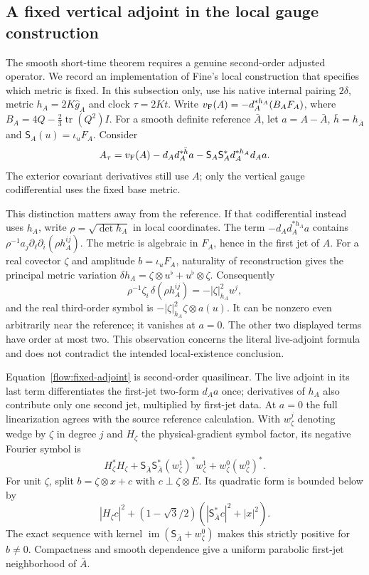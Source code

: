 \documentclass[11pt]{article}
\numberwithin{equation}{section}
\theoremstyle{definition}
\theoremstyle{remark}
\begin{document}
\subsection{A fixed vertical adjoint in the local gauge construction}
\label{subsec:fixed-adjoint}

The smooth short-time theorem requires a genuine second-order adjusted
operator.  We record an implementation of Fine's local construction
\cite[Section 4.2]{Fine2011} that specifies which metric is fixed.
In this subsection only, use his native internal pairing $2\delta$,
metric $h_A=2K\widehat g_A$ and clock $\tau=2Kt$.
Write $v_{\rm F}(A)=-d_A^{*h_A}(B_AF_A)$, where
$B_A=4Q-\tfrac23\operatorname{tr}(Q^2)I$.
For a smooth definite reference $\bar A$, let $a=A-\bar A$,
$\bar h=h_{\bar A}$ and $\mathsf S_A(u)=\iota_uF_A$.
Consider
\begin{equation}\label{flow:fixed-adjoint}
 A_\tau=v_{\rm F}(A)-d_A d_A^{*\bar h}a
              -\mathsf S_A\mathsf S_A^*d_A^{*h_A}d_Aa.
\end{equation}
The exterior covariant derivatives still use $A$; only the
vertical gauge codifferential uses the fixed base metric.

This distinction matters away from the reference.  If that
codifferential instead uses $h_A$, write
$\rho=\sqrt{\det h_A}$ in local coordinates.  The term
$-d_A d_A^{*h_A}a$ contains
$\rho^{-1}a_j\partial_\ell\partial_i(\rho h_A^{ij})$.
The metric is algebraic in $F_A$, hence in the first jet of $A$.
For a real covector $\zeta$ and amplitude $b=\iota_uF_A$,
naturality of reconstruction gives the principal metric variation
$\delta h_A=\zeta\otimes u^\flat+u^\flat\otimes\zeta$.  Consequently
\[
 \rho^{-1}\zeta_i\,\delta(\rho h_A^{ij})
       =-|\zeta|_{h_A}^2u^j,
\]
and the real third-order symbol is
$-|\zeta|_{h_A}^2\zeta\otimes a(u)$.
It can be nonzero even arbitrarily near the reference; it vanishes
at $a=0$.  The other two displayed terms have order at most two.
This observation concerns the literal live-adjoint formula and
does not contradict the intended local-existence conclusion.

Equation~\eqref{flow:fixed-adjoint} is second-order quasilinear.
The live adjoint in its last term differentiates the first-jet
two-form $d_Aa$ once; derivatives of $h_A$ also contribute only
one second jet, multiplied by first-jet data.  At $a=0$ the
full linearization agrees with the source reference calculation.
With $w_\zeta^j$ denoting wedge by $\zeta$ in degree $j$ and
$H_\zeta$ the physical-gradient symbol factor, its negative
Fourier symbol is
\[
 H_\zeta^*H_\zeta+
 \mathsf S_{\bar A}\mathsf S_{\bar A}^*
       (w_\zeta^1)^*w_\zeta^1+
 w_\zeta^0(w_\zeta^0)^* .
\]
For unit $\zeta$, split $b=\zeta\otimes x+c$ with
$c\perp\zeta\otimes E$.  Its quadratic form is bounded below by
\[
 |H_\zeta c|^2+
 (1-\sqrt3/2)(|\mathsf S_{\bar A}^*c|^2+|x|^2).
\]
The exact sequence with kernel
$\operatorname{im}(\mathsf S_{\bar A}+w_\zeta^0)$ makes this
strictly positive for $b\ne0$.  Compactness and smooth dependence
give a uniform parabolic first-jet neighborhood of $\bar A$.
\end{document}
